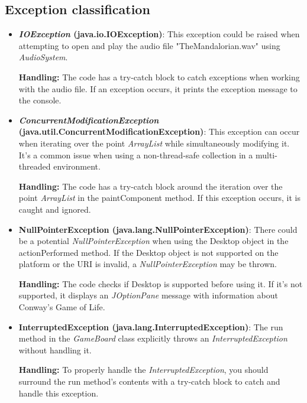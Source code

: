 \documentclass[12pt]{article}
\begin{document}
  \subsection*{Exception classification}
  \begin{itemize}
    \item \textbf{\textit{IOException} (java.io.IOException)}: This exception could be raised when attempting to open and play the audio file "TheMandalorian.wav" using \textit{AudioSystem}. 

    \textbf{Handling:} The code has a try-catch block to catch exceptions when working with the audio file. If an exception occurs, it prints the exception message to the console.
    \item \textbf{\textit{ConcurrentModificationException} (java.util.ConcurrentModificationException)}: This exception can occur when iterating over the point \textit{ArrayList} while simultaneously modifying it. It's a common issue when using a non-thread-safe collection in a multi-threaded environment.
    
    \textbf{Handling:} The code has a try-catch block around the iteration over the point \textit{ArrayList} in the paintComponent method. If this exception occurs, it is caught and ignored.
    \item \textbf{NullPointerException (java.lang.NullPointerException)}: There could be a potential \textit{NullPointerException} when using the Desktop object in the actionPerformed method. If the Desktop object is not supported on the platform or the URI is invalid, a \textit{NullPointerException} may be thrown.
    
    \textbf{Handling:} The code checks if Desktop is supported before using it. If it's not supported, it displays an \textit{JOptionPane} message with information about Conway's Game of Life.
    \item \textbf{InterruptedException (java.lang.InterruptedException)}: The run method in the \textit{GameBoard} class explicitly throws an \textit{InterruptedException} without handling it.
    
    \textbf{Handling:} To properly handle the \textit{InterruptedException}, you should surround the run method's contents with a try-catch block to catch and handle this exception.
  \end{itemize}
\end{document}

